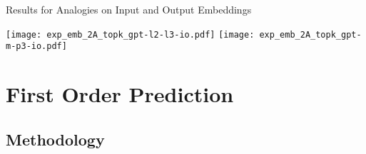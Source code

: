 \documentclass[aspectratio=169, 12pt, compress]{beamer}
\begin{document}
    \begin{frame}{Results for Analogies on Input and Output Embeddings}
        \vspace*{0.3cm}
        \begin{minipage}{\textwidth}
            \centering
            \texttt{[image: exp\_emb\_2A\_topk\_gpt-l2-l3-io.pdf]}%
            \texttt{[image: exp\_emb\_2A\_topk\_gpt-m-p3-io.pdf]}%
        \end{minipage}%
    \end{frame}


    \section{First Order Prediction}

    \subsection{Methodology}
\end{document}
